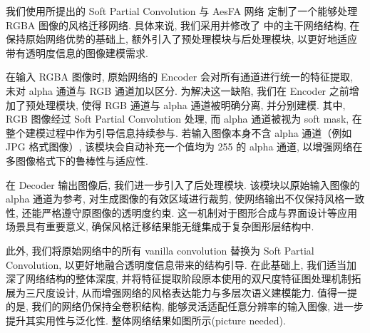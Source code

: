 我们使用所提出的 Soft Partial Convolution 与 AesFA 网络\cite{kwon2024aesfa} 定制了一个能够处理 RGBA 图像的风格迁移网络. 具体来说, 我们采用并修改了 \cite{kwon2024aesfa} 中的主干网络结构, 在保持原始网络优势的基础上, 额外引入了预处理模块与后处理模块, 以更好地适应带有透明度信息的图像建模需求. 

在输入 RGBA 图像时, 原始网络的 Encoder 会对所有通道进行统一的特征提取, 未对 alpha 通道与 RGB 通道加以区分. 为解决这一缺陷, 我们在 Encoder 之前增加了预处理模块, 使得 RGB 通道与 alpha 通道被明确分离, 并分别建模. 其中, RGB 图像经过 Soft Partial Convolution 处理, 而 alpha 通道被视为 soft mask, 在整个建模过程中作为引导信息持续参与. 若输入图像本身不含 alpha 通道（例如 JPG 格式图像）, 该模块会自动补充一个值均为 255 的 alpha 通道, 以增强网络在多图像格式下的鲁棒性与适应性. 

在 Decoder 输出图像后, 我们进一步引入了后处理模块. 该模块以原始输入图像的 alpha 通道为参考, 对生成图像的有效区域进行裁剪, 使网络输出不仅保持风格一致性, 还能严格遵守原图像的透明度约束. 这一机制对于图形合成与界面设计等应用场景具有重要意义, 确保风格迁移结果能无缝集成于复杂图形层结构中. 

此外, 我们将原始网络\cite{kwon2024aesfa}中的所有 vanilla convolution 替换为 Soft Partial Convolution, 以更好地融合透明度信息带来的结构引导. 在此基础上, 我们适当加深了网络结构的整体深度, 并将特征提取阶段原本使用的双尺度特征图处理机制拓展为三尺度设计, 从而增强网络的风格表达能力与多层次语义建模能力. 值得一提的是, 我们的网络仍保持全卷积结构, 能够灵活适配任意分辨率的输入图像, 进一步提升其实用性与泛化性.  整体网络结果如图所示(picture needed).